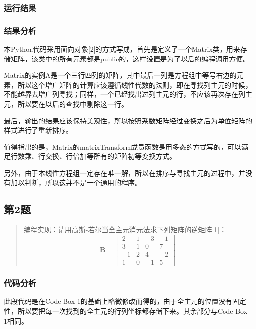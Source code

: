 \subsubsection{运行结果}

\subsubsection{结果分析}

本Python代码采用面向对象[2]的方式写成，首先是定义了一个Matrix类，用来存储矩阵，该类中的所有元素都是public的，这样设置是为了以后的编程调用方便。

Matrix的实例A是一个三行四列的矩阵，其中最后一列是方程组中等号右边的元素，所以这个增广矩阵的计算应该遵循线性代数的法则，即在寻找列主元的时候，不能越界去增广列寻找；同样，一个已经找出过列主元的行，不应该再次存在列主元，所以要在以后的查找中剔除这一行。

最后，输出的结果应该保持美观性，所以按照系数矩阵经过变换之后为单位矩阵的样式进行了重新排序。

值得指出的是，Matrix的matrixTransform成员函数是用多态的方式写的，可以满足行数乘、行交换、行倍加等所有的矩阵初等变换方式。

另外，由于本线性方程组一定存在唯一解，所以在排序与寻找主元的过程中，并没有加以判断，所以这并不是一个通用的程序。

\subsection{第2题}
\begin{quote}
    {\kaishu
        编程实现：请用高斯-若尔当全主元消元法求下列矩阵的逆矩阵[1]：
    }
    \begin{equation}
        \mathbf{B} = \left[\begin{array}{rrrr}
            2   & 1  & -3   & -1 \\
            3   & 1  & 0    & 7  \\
            -1  & 2  & 4    & -2 \\
            1   & 0  & -1   & 5
        \end{array}\right]
    \end{equation}
\end{quote}

\subsubsection{代码分析}
此段代码是在Code Box 1的基础上略微修改而得的，由于全主元的位置没有固定性，所以要把每一次找到的全主元的行列坐标都存储下来。其余部分与Code Box 1相同。

